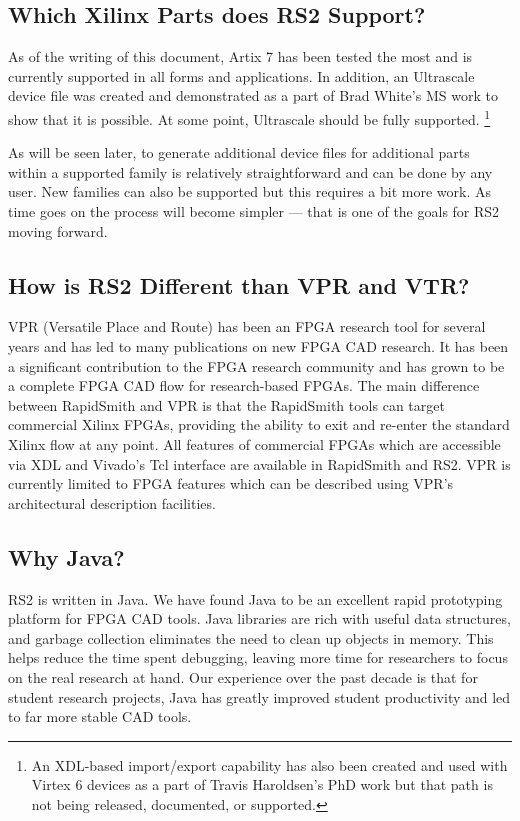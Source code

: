 \documentclass[10pt]{article}
\begin{document}
\subsection{Which Xilinx Parts does RS2 Support?}
As of the writing of this document, Artix 7 has been tested the most and is
currently supported in all forms and applications.  In addition, an Ultrascale
device file was created and demonstrated as a part of Brad White's MS work to
show that it is possible. At some point, Ultrascale should be fully supported.
\footnote{An XDL-based import/export capability has also been created and used
with Virtex 6 devices as a part of Travis Haroldsen's PhD work but that path is
not being released, documented, or supported.}

As will be seen later, to generate additional device files for additional parts
within a supported family is relatively straightforward and can be done by any
user.  New families can also be supported but this
requires a bit more work.  As time goes on the process will become simpler ---
that is one of the goals for RS2 moving forward.

\subsection{How is RS2 Different than VPR and VTR?}
VPR (Versatile Place and Route) has been an FPGA research tool for several years
and has led to many publications on new FPGA CAD research. It has been a
significant contribution to the FPGA research community and has grown to be a
complete FPGA CAD flow for research-based FPGAs. The main difference between
RapidSmith and VPR is that the RapidSmith tools can target commercial Xilinx
FPGAs, providing the ability to exit and re-enter the standard Xilinx flow at
any point.  All features of commercial FPGAs which are accessible via XDL and
Vivado's Tcl interface are available in RapidSmith and RS2. VPR is currently
limited to FPGA features which can be described using VPR's architectural
description facilities.

\subsection{Why Java?}
RS2 is written in Java. We have found Java to be an excellent rapid prototyping
platform for FPGA CAD tools.  Java libraries are rich with useful data
structures, and garbage collection eliminates the need to clean up objects in
memory. This helps reduce the time spent debugging, leaving more
time for researchers to focus on the real research at hand.  Our experience over
the past decade is that for student research projects, Java has greatly improved
student productivity and led to far more stable CAD tools.
\end{document}
